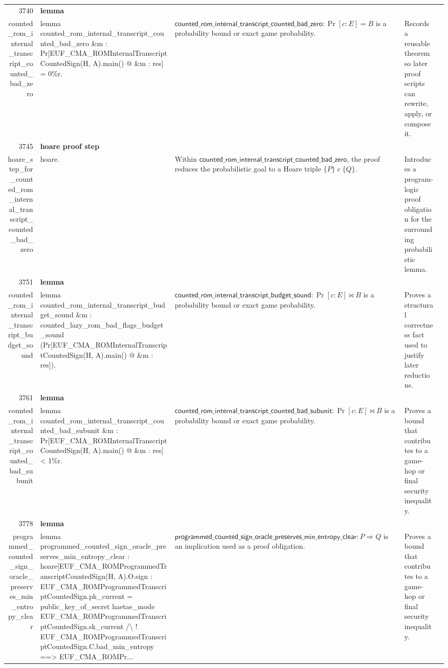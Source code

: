 \documentclass[10pt]{article}
\newcommand{\ec}[1]{\begingroup\ttfamily\scriptsize #1\endgroup}
\begin{document}
\begin{longtable}{r L{0.17\textwidth} L{0.26\textwidth} L{0.27\textwidth} L{0.20\textwidth}}
3740 & \textbf{lemma}\\\ec{counted\_rom\_internal\_transcript\_counted\_bad\_zero} & \ec{lemma counted\_rom\_internal\_transcript\_counted\_bad\_zero \&m : Pr[EUF\_CMA\_ROMInternalTranscriptCountedSign(H, A).main() @ \&m : res] = 0\%r.} & \(\mathsf{counted\_rom\_internal\_transcript\_counted\_bad\_zero} : \Pr[c : E] = B\) is a probability bound or exact game probability. & Records a reusable theorem so later proof scripts can rewrite, apply, or compose it. \\
3745 & \textbf{hoare proof step}\\\ec{hoare\_step\_for\_counted\_rom\_internal\_transcript\_counted\_bad\_zero} & \ec{hoare.} & Within \(\mathsf{counted\_rom\_internal\_transcript\_counted\_bad\_zero}\), the proof reduces the probabilistic goal to a Hoare triple \(\{P\}\;c\;\{Q\}\). & Introduces a program-logic proof obligation for the surrounding probabilistic lemma. \\
3751 & \textbf{lemma}\\\ec{counted\_rom\_internal\_transcript\_budget\_sound} & \ec{lemma counted\_rom\_internal\_transcript\_budget\_sound \&m : counted\_lazy\_rom\_bad\_flags\_budget\_sound (Pr[EUF\_CMA\_ROMInternalTranscriptCountedSign(H, A).main() @ \&m : res]).} & \(\mathsf{counted\_rom\_internal\_transcript\_budget\_sound} : \Pr[c : E] \bowtie B\) is a probability bound or exact game probability. & Proves a structural correctness fact used to justify later reductions. \\
3761 & \textbf{lemma}\\\ec{counted\_rom\_internal\_transcript\_counted\_bad\_subunit} & \ec{lemma counted\_rom\_internal\_transcript\_counted\_bad\_subunit \&m : Pr[EUF\_CMA\_ROMInternalTranscriptCountedSign(H, A).main() @ \&m : res] < 1\%r.} & \(\mathsf{counted\_rom\_internal\_transcript\_counted\_bad\_subunit} : \Pr[c : E] \bowtie B\) is a probability bound or exact game probability. & Proves a bound that contributes to a game-hop or final security inequality. \\
3778 & \textbf{lemma}\\\ec{programmed\_counted\_sign\_oracle\_preserves\_min\_entropy\_clear} & \ec{lemma programmed\_counted\_sign\_oracle\_preserves\_min\_entropy\_clear : hoare[EUF\_CMA\_ROMProgrammedTranscriptCountedSign(H, A).O.sign : EUF\_CMA\_ROMProgrammedTranscriptCountedSign.pk\_current = public\_key\_of\_secret haetae\_mode EUF\_CMA\_ROMProgrammedTranscriptCountedSign.sk\_current /\textbackslash{} ! EUF\_CMA\_ROMProgrammedTranscriptCountedSign.C.bad\_min\_entropy ==> EUF\_CMA\_ROMPr...} & \(\mathsf{programmed\_counted\_sign\_oracle\_preserves\_min\_entropy\_clear} : P \Rightarrow Q\) is an implication used as a proof obligation. & Proves a bound that contributes to a game-hop or final security inequality. \\

\end{longtable}
\end{document}
